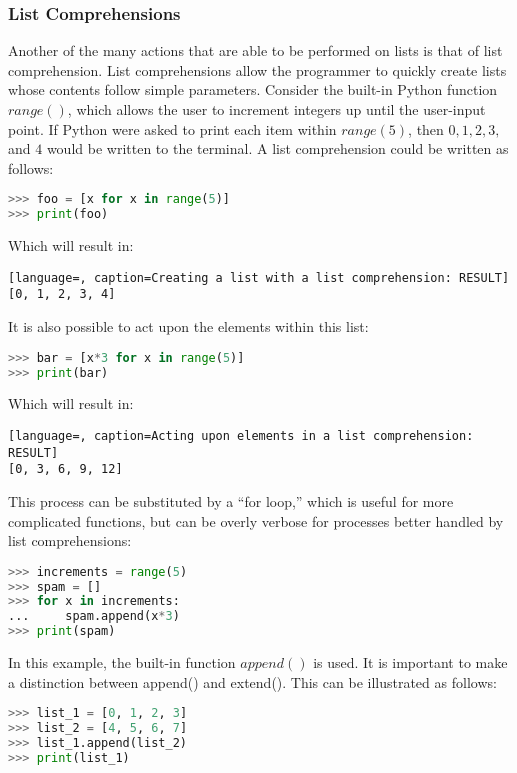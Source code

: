 \subsubsection{List Comprehensions}

Another of the many actions that are able to be performed on lists is that of list comprehension. List comprehensions allow the programmer to quickly create lists whose contents follow simple parameters. Consider the built-in Python function $range()$, which allows the user to increment integers up until the user-input point. If Python were asked to print each item within $range(5)$, then $0, 1, 2, 3,$ and $4$ would be written to the terminal. A list comprehension could be written as follows:
\singlespace
\begin{lstlisting}[language=Python, caption=Creating a list with a list comprehension]
>>> foo = [x for x in range(5)]
>>> print(foo)
\end{lstlisting}
\doublespace
Which will result in:
\singlespace
\begin{lstlisting}[language=, caption=Creating a list with a list comprehension: RESULT]
[0, 1, 2, 3, 4]
\end{lstlisting}
\doublespace
It is also possible to act upon the elements within this list:
\singlespace
\begin{lstlisting}[language=Python, caption=Acting upon elements in a list comprehension]
>>> bar = [x*3 for x in range(5)]
>>> print(bar)
\end{lstlisting}
\doublespace
Which will result in:
\singlespace
\begin{lstlisting}[language=, caption=Acting upon elements in a list comprehension: RESULT]
[0, 3, 6, 9, 12]
\end{lstlisting}
\doublespace
This process can be substituted by a ``for loop,'' which is useful for more complicated functions, but can be overly verbose for processes better handled by list comprehensions:
\singlespace
\begin{lstlisting}[language=Python, caption=Rewriting a list comprehension as a ``for loop'']
>>> increments = range(5)
>>> spam = []
>>> for x in increments:
...	    spam.append(x*3)
>>> print(spam)
\end{lstlisting}
\doublespace
In this example, the built-in function $append()$ is used. It is important to make a distinction between append() and extend(). This can be illustrated as follows:
\singlespace
\begin{lstlisting}[language=Python, caption=Appending elements to a list]
>>> list_1 = [0, 1, 2, 3]
>>> list_2 = [4, 5, 6, 7]
>>> list_1.append(list_2)
>>> print(list_1)
\end{lstlisting}
